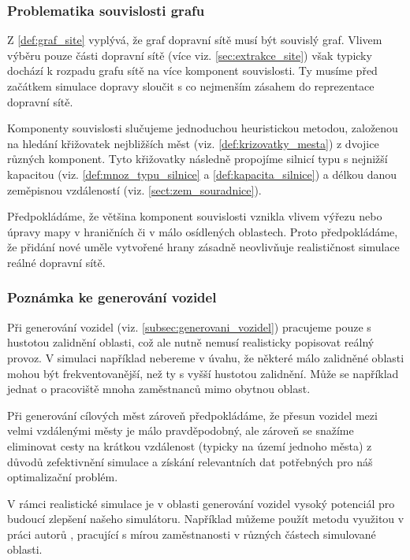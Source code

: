 \subsubsection{Problematika souvislosti grafu}
\label{subsubsec:souvislost_grafu}

Z \cref{def:graf_site} vyplývá, že graf dopravní sítě musí být souvislý graf. Vlivem
výběru pouze části dopravní sítě (více viz. \cref{sec:extrakce_site}) však typicky
dochází k rozpadu grafu sítě na více komponent souvislosti. Ty musíme před začátkem 
simulace dopravy sloučit s co nejmenším zásahem do reprezentace dopravní sítě.

Komponenty souvislosti slučujeme jednoduchou heuristickou metodou, založenou na 
hledání křižovatek nejbližších měst (viz. \cref{def:krizovatky_mesta}) 
z dvojice různých komponent. Tyto křižovatky následně propojíme silnicí typu
s nejnižší kapacitou (viz. \cref{def:mnoz_typu_silnice} a \cref{def:kapacita_silnice}) a
délkou danou zeměpisnou vzdáleností (viz. \cref{sect:zem_souradnice}).

Předpokládáme, že většina komponent souvislosti vznikla vlivem výřezu nebo úpravy mapy 
v hraničních či v málo osídlených oblastech. Proto předpokládáme, že přidání nové uměle 
vytvořené hrany zásadně neovlivňuje realističnost simulace reálné dopravní sítě.


\subsubsection{Poznámka ke generování vozidel}

Při generování vozidel (viz. \cref{subsec:generovani_vozidel}) pracujeme pouze
s hustotou zalidnění oblasti, což ale nutně nemusí realisticky popisovat reálný provoz.
V simulaci například nebereme v úvahu, že některé málo zalidněné oblasti mohou
být frekventovanější, než ty s vyšší hustotou zalidnění. Může se například jednat o
pracoviště mnoha zaměstnanců mimo obytnou oblast.

Při generování cílových měst zároveň předpokládáme, že přesun vozidel mezi velmi 
vzdálenými městy je málo pravděpodobný, ale zároveň se snažíme eliminovat cesty na
krátkou vzdálenost (typicky na území jednoho města) z důvodů zefektivnění simulace
a získání relevantních dat potřebných pro náš optimalizační problém.

V rámci realistické simulace je v oblasti generování vozidel vysoký potenciál 
pro budoucí zlepšení našeho simulátoru. Například můžeme použít metodu využitou 
v práci autorů \citet{kmeans_layout}, pracující s mírou zaměstnanosti v různých částech
simulované oblasti.

